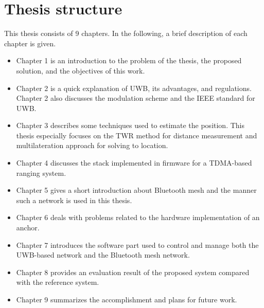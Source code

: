\documentclass[\main/main.tex]{subfiles}
\begin{document}
\section{Thesis structure}
This thesis consists of 9 chapters. In the following, a brief description of each chapter is given.
\begin{itemize}
    \item Chapter 1 is an introduction to the problem of the thesis, the proposed solution, and the objectives of this work.
    \item Chapter 2 is a quick explanation of UWB, its advantages, and regulations. Chapter 2 also discusses the modulation scheme and the IEEE standard for UWB.
    \item Chapter 3 describes some techniques used to estimate the position. This thesis especially focuses on the TWR method for distance measurement and multilateration approach for solving to location.
    \item Chapter 4 discusses the stack implemented in firmware for a TDMA-based ranging system.
    \item Chapter 5 gives a short introduction about Bluetooth mesh and the manner such a network is used in this thesis.
    \item Chapter 6 deals with problems related to the hardware implementation of an anchor.
    \item Chapter 7 introduces the software part used to control and manage both the UWB-based network and the Bluetooth mesh network.
    \item Chapter 8 provides an evaluation result of the proposed system compared with the reference system.
    \item Chapter 9 summarizes the accomplishment and plans for future work.
\end{itemize}
\bib
\end{document}

